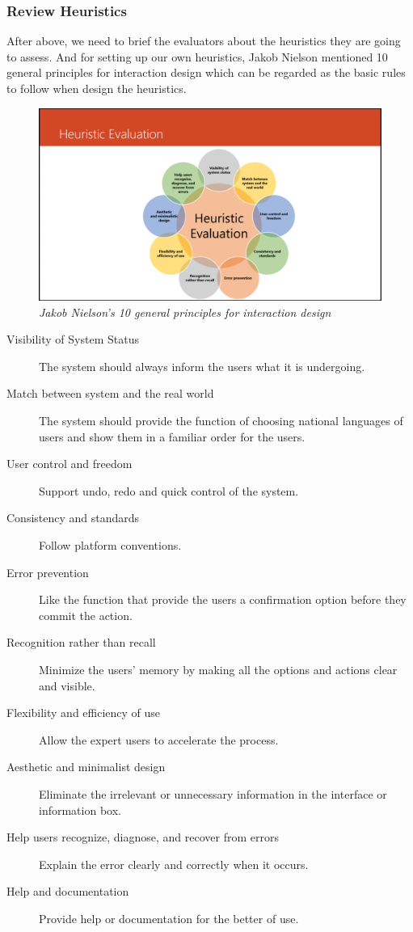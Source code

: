 \documentclass[twocolumn]{article}
\begin{document}
\subsubsection{Review Heuristics}
After above, we need to brief the evaluators about the heuristics they are going to assess. And for setting up our own heuristics, Jakob Nielson mentioned 10 general principles for interaction design \citep{Nielsen1995UsabilityHeuristics} which can be regarded as the basic rules to follow when design the heuristics.

\begin{figure}
  \centering
  \includegraphics[width=\columnwidth, clip=true, trim=380 5 300 160]{fig/heuristic-evaluation.png}
  \caption{\emph{Jakob Nielson's 10 general principles for interaction design}}
  \label{fig:heuristic-evaluation}
\end{figure}

\begin{description}
  \item[Visibility of System Status]
    The system should always inform the users what it is undergoing.
  \item[Match between system and the real world]
    The system should provide the function of choosing national languages of users and show them in a familiar order for the users.
  \item[User control and freedom]
    Support undo, redo and quick control of the system.
  \item[Consistency and standards]
    Follow platform conventions.
  \item[Error prevention]
    Like the function that provide the users a confirmation option before they commit the action.
  \item[Recognition rather than recall]
    Minimize the users’ memory by making all the options and actions clear and visible.
  \item[Flexibility and efficiency of use]
    Allow the expert users to accelerate the process.
  \item[Aesthetic and minimalist design]
    Eliminate the irrelevant or unnecessary information in the interface or information box.
  \item[Help users recognize, diagnose, and recover from errors]
    Explain the error clearly and correctly when it occurs.
  \item[Help and documentation]
    Provide help or documentation for the better of use.
\end{description}
\end{document}
